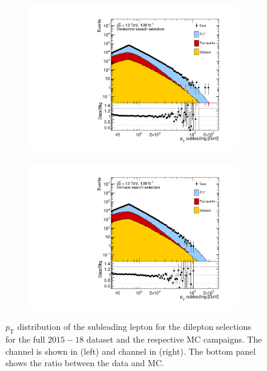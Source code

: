 \begin{figure}[]
    \centering
    \begin{subfigure}[b]{0.49\textwidth}
        \centering
        \includegraphics[width=\textwidth]{figures/analysis/datamc/dataMCcompare/ee_pt2_log100.pdf}
        \label{fig:datamc:eept2}
    \end{subfigure}
    \begin{subfigure}[b]{0.49\textwidth}
        \centering
        \includegraphics[width=\textwidth]{figures/analysis/datamc/dataMCcompare/uu_pt2_log100.pdf}
        \label{fig:datamc:uupt2}
    \end{subfigure}
    \caption[$p_\mathrm{T}$ distribution of the subleading lepton for the dilepton selections for the full $2015-18$ dataset and the respective MC campaigns.]{$p_\mathrm{T}$ distribution of the subleading lepton for the dilepton selections for the full $2015-18$ dataset and the respective MC campaigns. The \ee channel is shown in (left) and \mumu channel in (right). The bottom panel shows the ratio between the data and MC.}
    \label{fig:datamc:pt2}
\end{figure}

